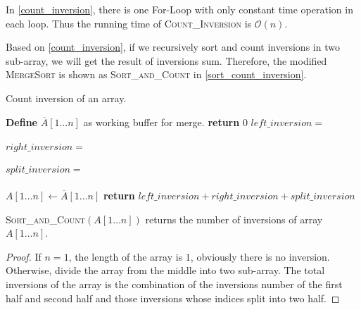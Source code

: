 \begin{homeworkProblem}[Inversions]
In \cref{count_inversion}, there is one For-Loop with only constant time operation
in each loop. Thus the running time of \textsc{Count\_Inversion} is $\mathcal{O}(n)$.

Based on \cref{count_inversion}, if we recursively sort and count inversions in two
sub-array, we will get the result of inversions sum. Therefore, the modified
\textsc{MergeSort} is shown as \textsc{Sort\_and\_Count} in \cref{sort_count_inversion}.

\begin{algorithm}[H]
    \caption{Count inversion of an array.} \label{sort_count_inversion}
    \begin{algorithmic}[1]
            \State \textbf{Define} $\overline{A}[1 \ldots n]$ as working buffer for merge.
             
                \State \textbf{return} 0
            \Else {}
                \State $left\_inversion=$
                    \\\\
                \State $right\_inversion=$
                    \\\\
                \State $split\_inversion=$\Call{Count\_Inversions}{$\overline{A}[1 \ldots n]$, $A[1 \ldots \lfloor n/2 \rfloor$, $A[\lfloor n/2 \rfloor + 1 \ldots n]$}
                    \\\\
                \State $A[1 \ldots n] \leftarrow \overline{A}[1 \ldots n]$
            \EndIf
        \State \textbf{return } $left\_inversion + right\_inversion + split\_inversion$
        \EndProcedure
    \end{algorithmic}
\end{algorithm}


\Claim \textsc{Sort\_and\_Count}$(A[1 \ldots n])$ returns the number of inversions of array $A[1 \ldots n]$.

\begin{proof}
    If $n = 1$, the length of the array is $1$, obviously there is no inversion.
    Otherwise, divide the array from the middle into two sub-array. The total
    inversions of the array is the combination of the inversions number of the
    first half and second half and those inversions whose indices split into two half.


\end{proof}
\end{homeworkProblem}
